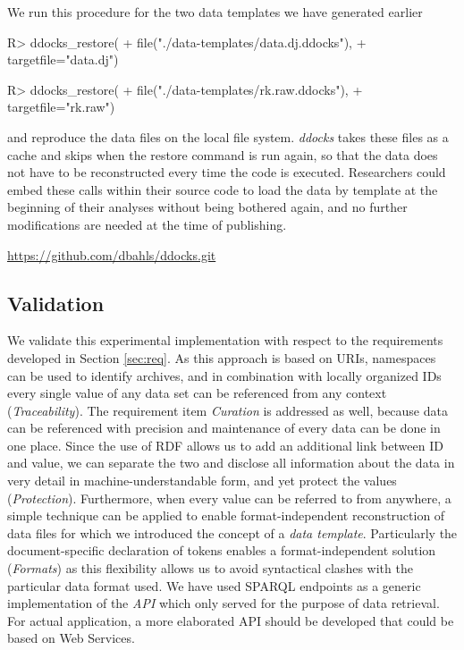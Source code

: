 \documentclass{sig-alternate}
\begin{document}
We run this procedure for the two data templates we have generated earlier
\begin{Schunk}
\begin{Sinput}
R> ddocks_restore(
+    file("./data-templates/data.dj.ddocks"), 
+    targetfile="data.dj")
\end{Sinput}
\end{Schunk}

\begin{Schunk}
\begin{Sinput}
R> ddocks_restore(
+    file("./data-templates/rk.raw.ddocks"), 
+    targetfile="rk.raw")
\end{Sinput}
\end{Schunk}
and reproduce the data files on the local file system.
\textit{ddocks} takes these files as a cache and skips when the restore command is run again, so that the data does not have to be reconstructed every time the code is executed.
Researchers could embed these calls within their source code to load the data by template at the beginning of their analyses without being bothered again, and no further modifications are needed at the time of publishing.


%
%
\url{https://github.com/dbahls/ddocks.git}




\subsection{Validation}


We validate this experimental implementation with respect to the requirements developed in Section \ref{sec:req}.
As this approach is based on URIs, namespaces can be used to identify archives, and in combination with locally organized IDs every single value of any data set can be referenced from any context (\textit{Traceability}).
The requirement item \textit{Curation} is addressed as well, because data can be referenced with precision and maintenance of every data can be done in one place. 
Since the use of RDF allows us to add an additional link between ID and value, we can separate the two and disclose all information about the data in very detail in machine-understandable form, and yet protect the values (\textit{Protection}).
Furthermore, when every value can be referred to from anywhere, a simple technique can be applied to enable format-independent reconstruction of data files for which we introduced the concept of a \textit{data template}.
Particularly the document-specific declaration of tokens enables a format-independent solution (\textit{Formats}) as this flexibility allows us to avoid syntactical clashes with the particular data format used.
We have used SPARQL endpoints as a generic implementation of the \textit{API} which only served for the purpose of data retrieval.
For actual application, a more elaborated API should be developed that could be based on Web Services.
\end{document}
